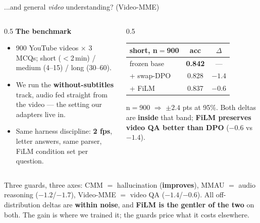\documentclass[aspectratio=169,11pt]{beamer}
\begin{document}
\begin{frame}{...and general \emph{video} understanding? (Video-MME)}
\begin{columns}[T]
\begin{column}{0.5\textwidth}\small
\textbf{The benchmark}
\begin{itemize}\footnotesize
\item 900 YouTube videos $\times$ 3 MCQs; short ($<$2\,min) / medium (4--15) / long (30--60).
\item We run the \textbf{without-subtitles} track, audio fed straight from the video --- the
setting our adapters live in.
\item Same harness discipline: \textbf{2 fps}, letter answers, same parser, FiLM condition set
per question.
\end{itemize}
\end{column}
\begin{column}{0.5\textwidth}
\centering
\renewcommand{\arraystretch}{1.2}
\small
\begin{tabular}{l c c}
\toprule
short, n$=$900 & acc & $\Delta$ \\
\midrule
frozen base     & \textbf{0.842} & --- \\ %
+ swap-DPO      & 0.828 & $-1.4$ \\ %
+ FiLM          & 0.837 & $-0.6$ \\ %
\bottomrule
\end{tabular}
\par\vspace{0.5em}
{\footnotesize n$=$900 $\Rightarrow$ $\pm2.4$ pts at 95\%. Both deltas are \textbf{inside} that
band; \textbf{FiLM preserves video QA better than DPO} ($-0.6$ vs $-1.4$).}
\end{column}
\end{columns}
\vfill
{\small Three guards, three axes: CMM $=$ hallucination (\textbf{improves}), MMAU $=$ audio
reasoning ($-1.2$/$-1.7$), Video-MME $=$ video QA ($-1.4$/$-0.6$). All off-distribution deltas are
\textbf{within noise}, and \textbf{FiLM is the gentler of the two} on both. The gain is where we
trained it; the guards price what it costs elsewhere.}
\end{frame}
\end{document}
